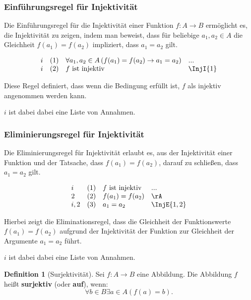 \documentclass{book}
\theoremstyle{plain}
\theoremstyle{remark}
\theoremstyle{definition}
\newtheorem{definition}{Definition}[section]
\begin{document}
\subsubsection*{Einführungsregel für Injektivität}
\label{rule:InjI}

Die Einführungsregel für die Injektivität einer Funktion \( f: A \to B \) ermöglicht es, die Injektivität zu zeigen, indem man beweist, dass für beliebige \( a_1, a_2 \in A \) die Gleichheit \( f(a_1) = f(a_2) \) impliziert, dass \( a_1 = a_2 \) gilt.

\[
\begin{array}{llll}
    i       & (1) & \forall a_1, a_2 \in A \, (f(a_1) = f(a_2) \rightarrow a_1 = a_2) & ... \\
    i       & (2) & f \text{ ist injektiv} & \InjI{1}
\end{array}
\]

Diese Regel definiert, dass wenn die Bedingung erfüllt ist, \( f \) als injektiv angenommen werden kann.

\(i\) ist dabei dabei eine Liste von Annahmen.

\subsubsection*{Eliminierungsregel für Injektivität}
\label{rule:InjE}

Die Eliminierungsregel für Injektivität erlaubt es, aus der Injektivität einer Funktion und der Tatsache, dass \( f(a_1) = f(a_2) \), darauf zu schließen, dass \( a_1 = a_2 \) gilt.

\[
\begin{array}{llll}
    i       & (1) & f \text{ ist injektiv} & ... \\
    2       & (2) & f(a_1) = f(a_2) & \rA \\
    i,2     & (3) & a_1 = a_2 & \InjE{1,2}
\end{array}
\]

Hierbei zeigt die Eliminationsregel, dass die Gleichheit der Funktionswerte \( f(a_1) = f(a_2) \) aufgrund der Injektivität der Funktion zur Gleichheit der Argumente \( a_1 = a_2 \) führt.

\(i\) ist dabei dabei eine Liste von Annahmen.

\begin{definition}[Surjektivität]
    Sei \( f: A \to B \) eine Abbildung. Die Abbildung \( f \) heißt \textbf{surjektiv} (oder \textbf{auf}), wenn: 
    \[
    \forall b\in B\exists a\in A(f(a) = b).
    \]
\end{definition}
\end{document}
